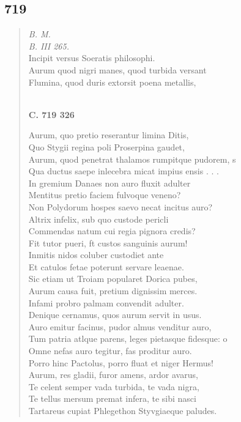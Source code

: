 \documentclass[11pt, a4paper]{report}
\begin{document}
            \subsection*{719}
      \begin{verse}
      \textit{B. M.} \\ \textit{B. III 265.} \\ Incipit versus Soeratis philosophi. \\ Aurum quod nigri manes, quod turbida versant \\ Flumina, quod duris extorsit poena metallis, \\ 
        ﻿\pagebreak 
    \begin{center} \textbf{C. 719 326} \end{center} \marginpar{[194]} Aurum, quo pretio reserantur limina Ditis, \\ Quo Stygii regina poli Proserpina gaudet, \\ Aurum, quod penetrat thalamos rumpitque pudorem, s \\ Qua ductus saepe inlecebra micat impius ensis . . . \\ In gremium Danaes non auro fluxit adulter \\ Mentitus pretio faciem fulvoque veneno? \\ Non Polydorum hospes saevo necat incitus auro? \\ Altrix infelix, sub quo custode pericli \\ Commendas natum cui regia pignora credis? \\ Fit tutor pueri, ft custos sanguinis aurum! \\ Inmitis nidos coluber custodiet ante \\ Et catulos fetae poterunt servare leaenae. \\ Sic etiam ut Troiam popularet Dorica pubes, \\ Aurum causa fuit, pretium dignissim merces. \\ Infami probro palmam convendit adulter. \\ Denique cernamus, quos aurum servit in usus. \\ Auro emitur facinus, pudor almus venditur auro, \\ Tum patria  \lbrack atlque parens, leges pietasque fidesque: o \\ Omne nefas auro tegitur, fas proditur auro. \\ Porro hinc Pactolus, porro fluat et niger Hermus! \\ Aurum, res gladii, furor amens, ardor avarus, \\ Te celent semper vada turbida, te vada nigra, \\ Te tellus mersum premat infera, te sibi nasci \\ Tartareus cupiat Phlegethon Styvgiaeque paludes. \\ 

\end{verse}
\end{document}
